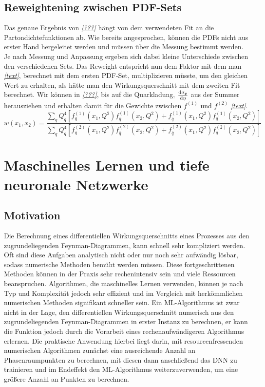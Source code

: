 \section{Reweightening zwischen PDF-Sets}
Das genaue Ergebnis von \textit{\autoref{???}} hängt von dem verwendeten Fit an die Partondichtefunktionen ab. Wie bereits angesprochen, können die PDFs nicht aus erster Hand hergeleitet werden und müssen über die Messung bestimmt werden. Je nach Messung und Anpassung ergeben sich dabei kleine Unterschiede zwischen den verschiedenen Sets. Das Reweight entspricht nun dem Faktor mit dem man \textit{\autoref{text}}, berechnet mit dem ersten PDF-Set, multiplizieren müsste, um den gleichen Wert zu erhalten, als hätte man den Wirkungsquerschnitt mit dem zweiten Fit berechnet. Wir können in \textit{\autoref{???}}, bis auf die Quarkladung,  $\derivative{\sigma_p}{\eta}$ aus der Summer herausziehen und erhalten damit für die Gewichte zwischen $f^{(1)}$ und $f^{(2)}$ \textit{\autoref{text}}.
\begin{equation}
	w\left(x_1, x_2\right) = \frac{ \sum_{q} Q_q^4 \left[f_q^{(1)}(x_1, Q^2)f_{\overline{q}}^{(1)}(x_2, Q^2) +f_{\overline{q}}^{(1)}(x_1, Q^2)f_{q}^{(1)}(x_2, Q^2) \right]}{\sum_{q} Q_q^4 \left[f_q^{(2)}(x_1, Q^2)f_{\overline{q}}^{(2)}(x_2, Q^2) +f_{\overline{q}}^{(2)}(x_1, Q^2)f_{q}^{(2)}(x_2, Q^2) \right]}
\end{equation}

\chapter{Maschinelles Lernen und tiefe neuronale Netzwerke}
\section{Motivation}
Die Berechnung eines differentiellen Wirkungsquerschnitts eines Prozesses aus den zugrundeliegenden Feynman-Diagrammen, kann schnell sehr kompliziert werden. Oft sind diese Aufgaben analytisch nicht oder nur noch sehr aufwändig lösbar, sodass numerische Methoden bemüht werden müssen. Diese fortgeschrittenen Methoden können in der Praxis sehr rechenintensiv sein und viele Ressourcen beanspruchen. Algorithmen, die maschinelles Lernen verwenden, können je nach Typ und Komplexität jedoch sehr effizient und im Vergleich mit herkömmlichen numerischen Methoden signifikant schneller sein. Ein ML-Algorithmus ist zwar nicht in der Lage, den differentiellen Wirkungsquerschnitt numerisch aus den zugrundeliegenden Feynman-Diagrammen in erster Instanz zu berechnen, er kann die Funktion jedoch durch die Vorarbeit eines rechenaufwändigeren Algorithmus erlernen. Die praktische Anwendung hierbei liegt darin, mit resourcenfressenden numerischen Algorithmen zunächst eine ausreichende Anzahl an Phasenraumpunkten zu berechnen, mit diesen dann anschließend das DNN zu trainieren und im Endeffekt den ML-Algorithmus weiterzuverwenden, um eine größere Anzahl an Punkten zu berechnen.

